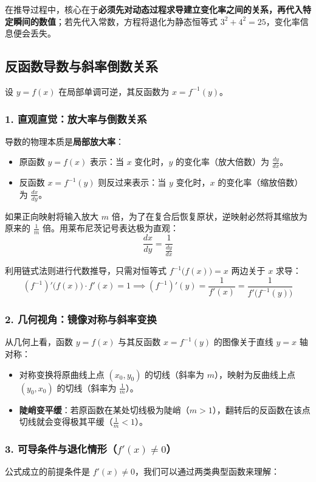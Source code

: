 在推导过程中，核心在于\textbf{必须先对动态过程求导建立变化率之间的关系，再代入特定瞬间的数值}；若先代入常数，方程将退化为静态恒等式 \(3^2+4^2=25\)，变化率信息便会丢失。

\subsection{反函数导数与斜率倒数关系}

设 \(y=f(x)\) 在局部单调可逆，其反函数为 \(x=f^{-1}(y)\)。

\subsubsection{1. 直观直觉：放大率与倒数关系}
导数的物理本质是\textbf{局部放大率}：
\begin{itemize}\tightlist
  \item 原函数 \(y=f(x)\) 表示：当 \(x\) 变化时，\(y\) 的变化率（放大倍数）为 \(\frac{dy}{dx}\)。
  \item 反函数 \(x=f^{-1}(y)\) 则反过来表示：当 \(y\) 变化时，\(x\) 的变化率（缩放倍数）为 \(\frac{dx}{dy}\)。
\end{itemize}
如果正向映射将输入放大 \(m\) 倍，为了在复合后恢复原状，逆映射必然将其缩放为原来的 \(\frac{1}{m}\) 倍。用莱布尼茨记号表达极为直观：
\[
\frac{dx}{dy} = \frac{1}{\frac{dy}{dx}}
\]

利用链式法则进行代数推导，只需对恒等式 \(f^{-1}\bigl(f(x)\bigr)=x\) 两边关于 \(x\) 求导：
\[
(f^{-1})'\bigl(f(x)\bigr)\cdot f'(x) = 1
\implies
(f^{-1})'(y) = \frac{1}{f'(x)} = \frac{1}{f'\bigl(f^{-1}(y)\bigr)}
\]

\subsubsection{2. 几何视角：镜像对称与斜率变换}
从几何上看，函数 \(y=f(x)\) 与其反函数 \(x=f^{-1}(y)\) 的图像关于直线 \(y=x\) 轴对称：
\begin{itemize}\tightlist
  \item 对称变换将原曲线上点 \((x_0, y_0)\) 的切线（斜率为 \(m\)），映射为反曲线上点 \((y_0, x_0)\) 的切线（斜率为 \(\frac{1}{m}\)）。
  \item \textbf{陡峭变平缓}：若原函数在某处切线极为陡峭（\(m > 1\)），翻转后的反函数在该点切线就会变得极其平缓（\(\frac{1}{m} < 1\)）。
\end{itemize}

\subsubsection{3. 可导条件与退化情形（\(f'(x) \neq 0\)）}
公式成立的前提条件是 \(f'(x) \neq 0\)，我们可以通过两类典型函数来理解：

